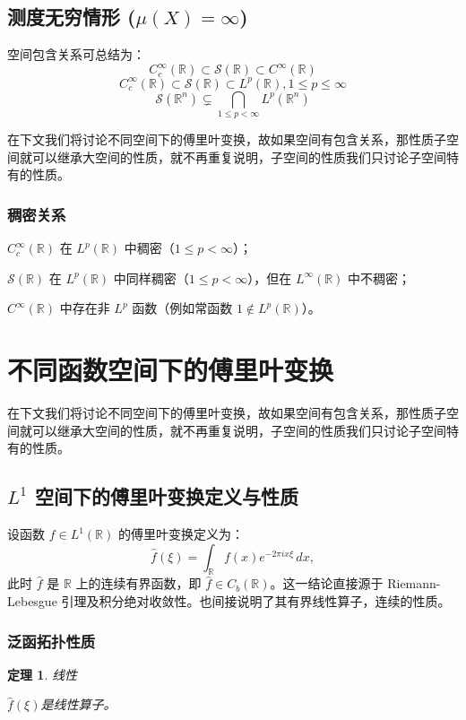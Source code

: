 \documentclass[12pt,a4paper]{article}
\newcommand{\diff}{\mathop{}\!\mathrm{d}}  %
\def\diff{d}%
\theoremstyle{plain}
\newtheorem{theorem}{定理}[section]
\theoremstyle{definition}
\theoremstyle{remark}
\begin{document}
	\subsection{测度无穷情形 ($\mu(X)=\infty$)}
	空间包含关系可总结为：
	\[
	C_c^\infty(\mathbb{R}) \subset \mathcal{S}(\mathbb{R}) \subset C^\infty(\mathbb{R})
	\]
\[
C_c^\infty(\mathbb{R}) \subset \mathcal{S}(\mathbb{R}) \subset  L^p(\mathbb{R}) ,1\leq p\le\infty
 \]
\[ 
\mathcal{S}(\mathbb{R}^n) \subsetneq \bigcap_{1 \leq p < \infty} L^p(\mathbb{R}^n)
 \]
 
在下文我们将讨论不同空间下的傅里叶变换，故如果空间有包含关系，那性质子空间就可以继承大空间的性质，就不再重复说明，子空间的性质我们只讨论子空间特有的性质。

\subsubsection{稠密关系}
 $C_c^\infty(\mathbb{R})$ 在 $L^p(\mathbb{R})$ 中稠密（$1 \leq p < \infty$）；
 
	 $\mathcal{S}(\mathbb{R})$ 在 $L^p(\mathbb{R})$ 中同样稠密（$1 \leq p < \infty$），但在 $L^\infty(\mathbb{R})$ 中不稠密；
	 
	 $C^\infty(\mathbb{R})$ 中存在非 $L^p$ 函数（例如常函数 $1 \notin L^p(\mathbb{R})$）。



	
\section{不同函数空间下的傅里叶变换}
	在下文我们将讨论不同空间下的傅里叶变换，故如果空间有包含关系，那性质子空间就可以继承大空间的性质，就不再重复说明，子空间的性质我们只讨论子空间特有的性质。
\subsection{$L^1$ 空间下的傅里叶变换定义与性质}
设函数 $f \in L^1(\mathbb{R})$ 的傅里叶变换定义为：
\[
\hat{f}(\xi) = \int_{\mathbb{R}} f(x) e^{-2\pi i x\xi} \, \diff x,
\]
此时 $\hat{f}$ 是 $\mathbb{R}$ 上的连续有界函数，即 $\hat{f} \in C_b(\mathbb{R})$。这一结论直接源于 Riemann-Lebesgue 引理及积分绝对收敛性。也间接说明了其有界线性算子，连续的性质。


\subsubsection{泛函拓扑性质}
  \begin{theorem}线性
  	
\(\hat{f}(\xi)\)是线性算子。
\end{theorem}
\end{document}
